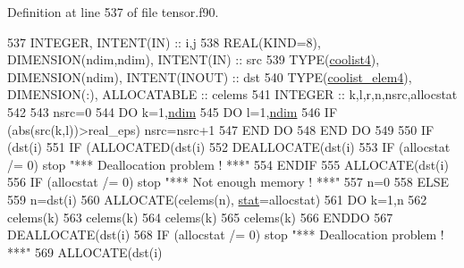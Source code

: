 Definition at line 537 of file tensor.\+f90.


\begin{DoxyCode}
537     \textcolor{keywordtype}{INTEGER}, \textcolor{keywordtype}{INTENT(IN)} :: i,j
538     \textcolor{keywordtype}{REAL(KIND=8)}, \textcolor{keywordtype}{DIMENSION(ndim,ndim)}, \textcolor{keywordtype}{INTENT(IN)} :: src
539     \textcolor{keywordtype}{TYPE}(\hyperlink{structtensor_1_1coolist4}{coolist4}), \textcolor{keywordtype}{DIMENSION(ndim)}, \textcolor{keywordtype}{INTENT(INOUT)} :: dst
540     \textcolor{keywordtype}{TYPE}(\hyperlink{structtensor_1_1coolist__elem4}{coolist\_elem4}), \textcolor{keywordtype}{DIMENSION(:)}, \textcolor{keywordtype}{ALLOCATABLE} :: celems
541     \textcolor{keywordtype}{INTEGER} :: k,l,r,n,nsrc,allocstat
542 
543     nsrc=0
544     \textcolor{keywordflow}{DO} k=1,\hyperlink{namespaceparams_a2323fe1773f086e20c14f266351c482b}{ndim}
545        \textcolor{keywordflow}{DO} l=1,\hyperlink{namespaceparams_a2323fe1773f086e20c14f266351c482b}{ndim}
546           \textcolor{keywordflow}{IF} (abs(src(k,l))>real\_eps) nsrc=nsrc+1
547 \textcolor{keywordflow}{       END DO}
548 \textcolor{keywordflow}{    END DO}
549 
550     \textcolor{keywordflow}{IF} (dst(i)%
551        \textcolor{keywordflow}{IF} (\textcolor{keyword}{ALLOCATED}(dst(i)%
552           \textcolor{keyword}{DEALLOCATE}(dst(i)%
553           \textcolor{keywordflow}{IF} (allocstat /= 0) stop \textcolor{stringliteral}{"*** Deallocation problem ! ***"}
554 \textcolor{keywordflow}{       ENDIF}
555        \textcolor{keyword}{ALLOCATE}(dst(i)%
556        \textcolor{keywordflow}{IF} (allocstat /= 0) stop \textcolor{stringliteral}{"*** Not enough memory ! ***"}
557        n=0
558     \textcolor{keywordflow}{ELSE}
559        n=dst(i)%
560        \textcolor{keyword}{ALLOCATE}(celems(n), \hyperlink{namespacestat}{stat}=allocstat)
561        \textcolor{keywordflow}{DO} k=1,n
562           celems(k)%
563           celems(k)%
564           celems(k)%
565           celems(k)%
566 \textcolor{keywordflow}{       ENDDO}
567        \textcolor{keyword}{DEALLOCATE}(dst(i)%
568        \textcolor{keywordflow}{IF} (allocstat /= 0) stop \textcolor{stringliteral}{"*** Deallocation problem ! ***"}
569        \textcolor{keyword}{ALLOCATE}(dst(i)%

\end{DoxyCode}
